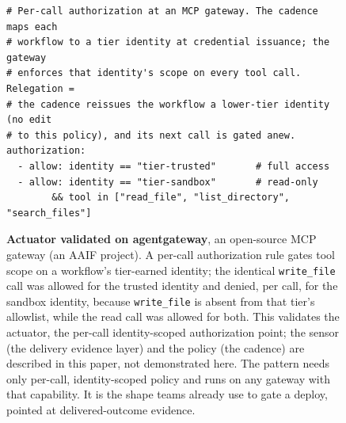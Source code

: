 \begin{figure}[!ht]
\centering
\begin{minipage}{0.92\linewidth}
\begin{lstlisting}[style=policy]
# Per-call authorization at an MCP gateway. The cadence maps each
# workflow to a tier identity at credential issuance; the gateway
# enforces that identity's scope on every tool call. Relegation =
# the cadence reissues the workflow a lower-tier identity (no edit
# to this policy), and its next call is gated anew.
authorization:
  - allow: identity == "tier-trusted"       # full access
  - allow: identity == "tier-sandbox"       # read-only
        && tool in ["read_file", "list_directory", "search_files"]
\end{lstlisting}
\end{minipage}
\caption{\textbf{Actuator validated on agentgateway}, an open-source MCP gateway (an AAIF project).
A per-call authorization rule gates tool scope on a workflow's tier-earned
identity; the identical \texttt{write\_file} call was allowed for the trusted
identity and denied, per call, for the sandbox identity, because
\texttt{write\_file} is absent from that tier's allowlist, while the read call was
allowed for both. This validates the actuator, the
per-call identity-scoped authorization point; the sensor (the delivery evidence
layer) and the policy (the cadence) are described in this paper, not demonstrated
here. The pattern needs only per-call, identity-scoped policy and runs on any
gateway with that capability. It is the shape teams already use to gate a
deploy, pointed at delivered-outcome evidence.}
\end{figure}
